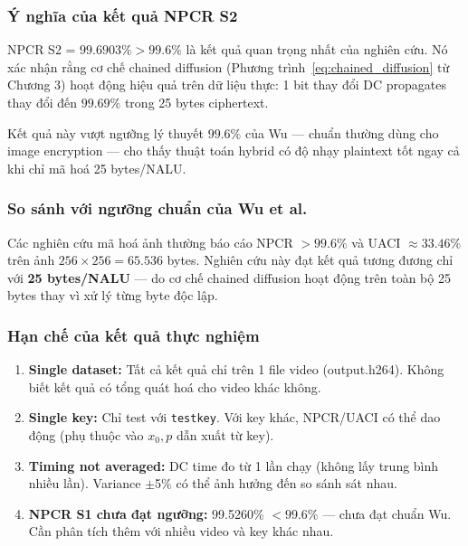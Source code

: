 \subsubsection{Ý nghĩa của kết quả NPCR S2}

NPCR S2 = $99.6903\% > 99.6\%$ là kết quả quan trọng nhất của nghiên cứu.
Nó xác nhận rằng cơ chế chained diffusion (Phương trình~\ref{eq:chained_diffusion}
từ Chương 3) hoạt động hiệu quả trên dữ liệu thực: 1 bit thay đổi DC
propagates thay đổi đến $99.69\%$ trong 25 bytes ciphertext.

Kết quả này vượt ngưỡng lý thuyết $99.6\%$ của Wu \cite{wu_npcr} --- chuẩn
thường dùng cho image encryption --- cho thấy thuật toán hybrid có độ nhạy plaintext
tốt ngay cả khi chỉ mã hoá 25 bytes/NALU.

\subsubsection{So sánh với ngưỡng chuẩn của Wu et al.}

Các nghiên cứu mã hoá ảnh thường báo cáo NPCR $>99.6\%$ và UACI $\approx 33.46\%$
trên ảnh $256 \times 256 = 65.536$ bytes. Nghiên cứu này đạt kết quả tương đương
chỉ với \textbf{25 bytes/NALU} --- do cơ chế chained diffusion hoạt động
trên toàn bộ 25 bytes thay vì xử lý từng byte độc lập.

\subsubsection{Hạn chế của kết quả thực nghiệm}

\begin{enumerate}
  \item \textbf{Single dataset:} Tất cả kết quả chỉ trên 1 file video (output.h264).
        Không biết kết quả có tổng quát hoá cho video khác không.

  \item \textbf{Single key:} Chỉ test với \texttt{testkey}. Với key khác, NPCR/UACI
        có thể dao động (phụ thuộc vào $x_0, p$ dẫn xuất từ key).

  \item \textbf{Timing not averaged:} DC time đo từ 1 lần chạy (không lấy trung bình
        nhiều lần). Variance $\pm$5\% có thể ảnh hưởng đến so sánh sát nhau.

  \item \textbf{NPCR S1 chưa đạt ngưỡng:} 99.5260\% $< 99.6\%$ --- chưa đạt chuẩn Wu.
        Cần phân tích thêm với nhiều video và key khác nhau.
\end{enumerate}
